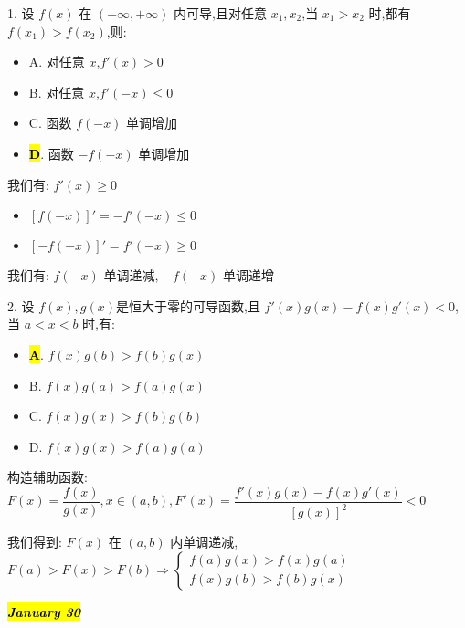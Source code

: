 1. 设 $f(x)$ 在 $(-\infty,+\infty)$ 内可导,且对任意 $x_{1},x_{2}$,当 $x_{1}>x_{2}$ 时,都有 $f(x_{1})>f(x_{2})$,则:
\begin{itemize}
	\item A. 对任意 $x$,$f'(x)>0$
	\item B. 对任意 $x$,$f'(-x)\leq 0$
	\item C. 函数 $f(-x)$ 单调增加
	\item \hl{\textbf{D}}. 函数 $-f(-x)$ 单调增加
\end{itemize}
\begin{solution}

	我们有: $f'(x)\geq 0$
	\begin{itemize}
		\item $[f(-x)]' = -f'(-x)\leq 0$
		\item $[-f(-x)]' = f'(-x)\geq 0$
	\end{itemize}

	我们有: $f(-x)$ 单调递减, $-f(-x)$ 单调递增
\end{solution}

2. 设 $f(x),g(x)$是恒大于零的可导函数,且 $f'(x)g(x)-f(x)g'(x)<0$,当 $a<x<b$ 时,有:
\begin{itemize}
	\item \hl{\textbf{A}}. $f(x)g(b)>f(b)g(x)$
	\item B. $f(x)g(a)>f(a)g(x)$
	\item C. $f(x)g(x)>f(b)g(b)$
	\item D. $f(x)g(x)>f(a)g(a)$
\end{itemize}
\begin{solution}

	构造辅助函数: $F(x) = \dfrac{f(x)}{g(x)}, x\in (a,b), F'(x) = \dfrac{f'(x)g(x)-f(x)g'(x)}{[g(x)]^{2}} < 0$

	我们得到: $F(x)$ 在 $(a,b)$ 内单调递减, $F(a) > F(x) > F(b)\Rightarrow 
	\begin{cases}
		f(a)g(x) > f(x)g(a)\\
		f(x)g(b) > f(b)g(x)
	\end{cases}$
\end{solution}

\hl{\textbf{\textit{January 30}}}


